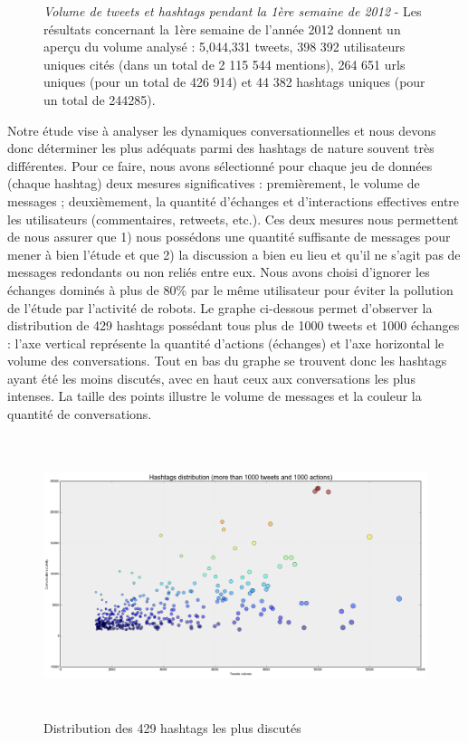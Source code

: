 \begin{figure}[ht]
    \caption[Volume de tweets et hashtags pendant la 1ère semaine de 2012]{\textit{Volume de tweets et hashtags pendant la 1ère semaine de 2012} - Les résultats concernant la 1ère semaine de l{\textquoteright}année 2012 donnent un aper\c{c}u du volume analysé : 5,044,331 tweets, 398 392 utilisateurs uniques cités (dans un total de 2 115 544 mentions), 264 651 urls uniques (pour un total de 426 914) et 44 382 hashtags uniques (pour un total de 244285).}

\end{figure}


Notre étude vise à analyser les dynamiques conversationnelles et nous devons donc déterminer les plus adéquats parmi des hashtags de nature souvent très différentes. Pour ce faire, nous avons sélectionné pour chaque jeu de données (chaque hashtag) deux mesures significatives : premièrement, le volume de messages ; deuxièmement, la quantité d{\textquoteright}échanges et d{\textquoteright}interactions effectives entre les utilisateurs (commentaires, retweets, etc.). Ces deux mesures nous permettent de nous assurer que 1) nous possédons une quantité suffisante de messages pour mener à bien l{\textquoteright}étude et que 2) la discussion a bien eu lieu et qu{\textquoteright}il ne s{\textquoteright}agit pas de messages redondants ou non reliés entre eux. Nous avons choisi d{\textquoteright}ignorer les échanges dominés à plus de 80\% par le m\^eme utilisateur pour éviter la pollution de l{\textquoteright}étude par l{\textquoteright}activité de robots. Le graphe ci-dessous permet d{\textquoteright}observer la distribution de 429 hashtags possédant tous plus de 1000 tweets et 1000 échanges : l{\textquoteright}axe vertical représente la quantité d{\textquoteright}actions (échanges) et l{\textquoteright}axe horizontal le volume des conversations. Tout en bas du graphe se trouvent donc les hashtags ayant été les moins discutés, avec en haut ceux aux conversations les plus intenses. La taille des points illustre le volume de messages et la couleur la quantité de conversations.

\begin{figure}
    \centering
    \includegraphics[width=6.0114in,height=3.2114in]{figures/chap3/chapitre3-img8.png}
    \caption{Distribution des 429 hashtags les plus discutés}
\end{figure}


